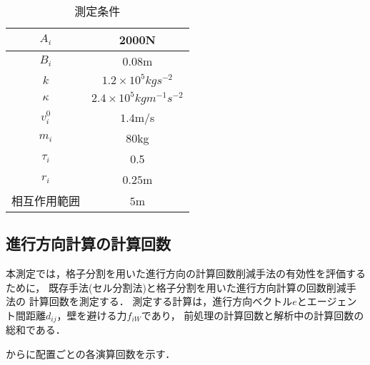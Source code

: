 \begin{table}[t]
  \begin{center}
    \caption{測定条件}
    \label{tb:result_para}
    \begin{tabular}{c|c}
      \hline \hline
      $A_i$            & 2000N                              \\ \hline 
      $B_i$            & 0.08m                              \\ \hline 
      $k$              & $1.2 \times 10^5 kg s^{-2} $       \\ \hline 
      $\kappa$         & $2.4 \times 10^5 kg m^{-1} s^{-2}$ \\ \hline 
      $v_i^0$          & $1.4$m/s                           \\ \hline 
      $m_i$            & $80$kg                             \\ \hline 
      $\tau_i$         & 0.5                               \\ \hline 
      $r_i$            & $0.25$m                            \\ \hline 
      相互作用範囲     & $5$m                              \\ \hline 
    \end{tabular}
  \end{center}
\end{table}

\subsection{進行方向計算の計算回数}
本測定では，格子分割を用いた進行方向の計算回数削減手法の有効性を評価するために，
既存手法(セル分割法)と格子分割を用いた進行方向計算の回数削減手法の
計算回数を測定する．
測定する計算は，進行方向ベクトル$e$とエージェント間距離$d_{ij}$，壁を避ける力$f_{iW}$であり，
前処理の計算回数と解析中の計算回数の総和である．


からに配置ごとの各演算回数を示す．





